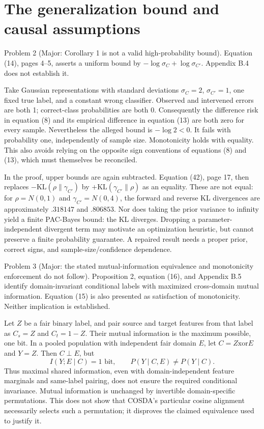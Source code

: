 \documentclass[10pt]{article}
\begin{document}
\section*{The generalization bound and causal assumptions}
Problem 2 (Major: Corollary 1 is not a valid high-probability bound).  Equation (14), pages 4–5, asserts a uniform bound by \(-\log\sigma_C+\log\sigma_{C'}\). Appendix B.4 does not establish it.\par
Take Gaussian representations with standard deviations \(\sigma_C=2\), \(\sigma_{C'}=1\), one fixed true label, and a constant wrong classifier. Observed and intervened errors are both 1; correct-class probabilities are both 0. Consequently the difference risk in equation (8) and its empirical difference in equation (13) are both zero for every sample. Nevertheless the alleged bound is \(-\log2<0\). It fails with probability one, independently of sample size. Monotonicity holds with equality. This also avoids relying on the opposite sign conventions of equations (8) and (13), which must themselves be reconciled.\par
In the proof, upper bounds are again subtracted. Equation (42), page 17, then replaces \(-\mathrm{KL}(\rho\|\gamma_{C'})\) by \(+\mathrm{KL}(\gamma_{C'}\|\rho)\) as an equality. These are not equal: for \(\rho=N(0,1)\) and \(\gamma_{C'}=N(0,4)\), the forward and reverse KL divergences are approximately \(.318147\) and \(.806853\). Nor does taking the prior variance to infinity yield a finite PAC-Bayes bound: the KL diverges. Dropping a parameter-independent divergent term may motivate an optimization heuristic, but cannot preserve a finite probability guarantee. A repaired result needs a proper prior, correct signs, and sample-size/confidence dependence.\par
Problem 3 (Major: the stated mutual-information equivalence and monotonicity enforcement do not follow).  Proposition 2, equation (16), and Appendix B.5 identify domain-invariant conditional labels with maximized cross-domain mutual information. Equation (15) is also presented as satisfaction of monotonicity. Neither implication is established.\par
Let \(Z\) be a fair binary label, and pair source and target features from that label as \(C_s=Z\) and \(C_t=1-Z\). Their mutual information is the maximum possible, one bit. In a pooled population with independent fair domain \(E\), let \(C=Z\mathbin{\mathrm{xor}}E\) and \(Y=Z\). Then \(C\perp E\), but \[I(Y;E\mid C)=1\text{ bit},\qquad
 P(Y\mid C,E)\ne P(Y\mid C).\] Thus maximal shared information, even with domain-independent feature marginals and same-label pairing, does not ensure the required conditional invariance. Mutual information is unchanged by invertible domain-specific permutations. This does not show that COSDA’s particular cosine alignment necessarily selects such a permutation; it disproves the claimed equivalence used to justify it.\par
\end{document}
